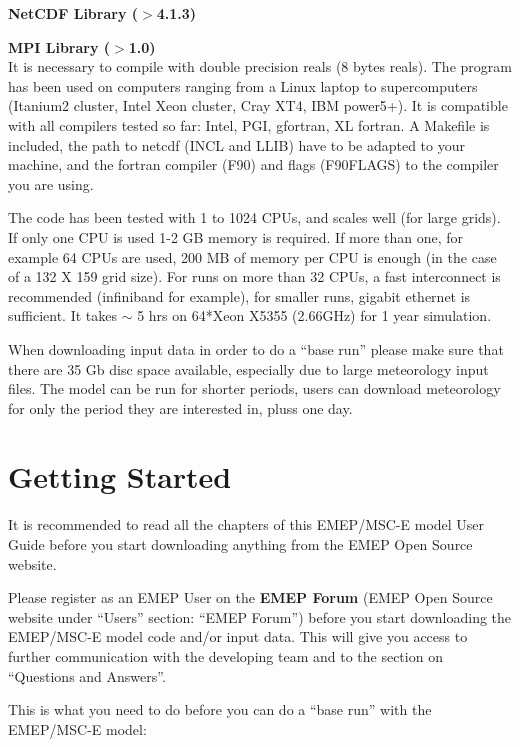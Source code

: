 \textbf{NetCDF Library ($>$4.1.3)}

\textbf{MPI Library ($>$1.0)}\\

It is necessary to compile with double precision reals (8 bytes
reals). The program has been used on computers ranging from a Linux laptop to supercomputers 
(Itanium2 cluster, Intel Xeon cluster, Cray XT4, IBM power5+). It is compatible with all 
compilers tested so far:  Intel, PGI, gfortran, XL fortran. A Makefile is included,  
the path to netcdf (INCL and LLIB) have to be adapted to your machine, and the fortran 
compiler (F90) and flags (F90FLAGS) to the compiler you are using.



The code has been tested with 1 to 1024 CPUs, and scales well (for large grids).  If only one 
CPU is used 1-2 GB memory is required. If more than one,
for example 64 CPUs are used, 200 MB of memory per CPU is enough (in
the case of a 132 X 159 grid size). For runs on more than 32 CPUs, a fast interconnect is 
recommended (infiniband for example), for smaller runs, gigabit ethernet is sufficient. 
It takes $\sim$ 5 hrs on 64*Xeon X5355 (2.66GHz) for 1 year simulation.

When downloading input data in order to do a ``base run'' please make
sure that there are 35 Gb disc space available, especially due to
large meteorology input files. The model can be run for shorter periods, users 
can download meteorology for only the period they are interested in, pluss one day. 
 

\section{Getting Started}


It is recommended to read all the chapters of this EMEP/MSC-E model
User Guide before you start downloading anything from the EMEP Open
Source website.

Please register as an EMEP User on the {\bf EMEP Forum}
(EMEP Open Source website under ``Users'' section: ``EMEP Forum'')
before you start downloading the EMEP/MSC-E model code and/or input
data. This will give you access to further communication with the
developing team and to the section on ``Questions and Answers''. 


This is what you need to do before you can do a ``base run'' with the 
EMEP/MSC-E model:

